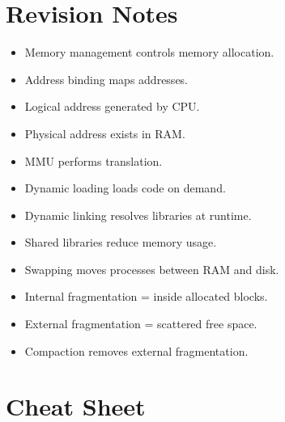 \section{Revision Notes}

\begin{itemize}
\item Memory management controls memory allocation.
\item Address binding maps addresses.
\item Logical address generated by CPU.
\item Physical address exists in RAM.
\item MMU performs translation.
\item Dynamic loading loads code on demand.
\item Dynamic linking resolves libraries at runtime.
\item Shared libraries reduce memory usage.
\item Swapping moves processes between RAM and disk.
\item Internal fragmentation = inside allocated blocks.
\item External fragmentation = scattered free space.
\item Compaction removes external fragmentation.
\end{itemize}

\section{Cheat Sheet}

